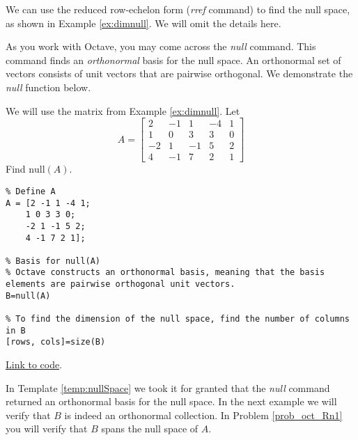 \documentclass{ximera}
\begin{document}
We can use the reduced row-echelon form (\emph{rref} command) to find the null space, as shown in Example \ref{ex:dimnull}.  We will omit the details here.

As you work with Octave, you may come across the \emph{null} command.  This command finds an \emph{orthonormal} basis for the null space.  An orthonormal set of vectors consists of unit vectors that are pairwise orthogonal.  We demonstrate the \emph{null} function below.

\begin{template}\label{temp:nullSpace}
    We will use the matrix from Example \ref{ex:dimnull}.  Let 
$$A=\begin{bmatrix}2&-1&1&-4&1\\1&0&3&3&0\\-2&1&-1&5&2\\4&-1&7&2&1\end{bmatrix}$$
Find $\mbox{null}(A)$.

\begin{verbatim}
% Define A
A = [2 -1 1 -4 1;
    1 0 3 3 0;
    -2 1 -1 5 2;
    4 -1 7 2 1];

% Basis for null(A)
% Octave constructs an orthonormal basis, meaning that the basis elements are pairwise orthogonal unit vectors.
B=null(A)

% To find the dimension of the null space, find the number of columns in B
[rows, cols]=size(B)
\end{verbatim}

\href{https://sagecell.sagemath.org/?z=eJxFj0FrwzAMhe-B_Id3KbTQjCbr2GHkkLD7LruVHlxXaQ2JVCynhf36yW3ZLDDo83t68gKfNAQmdGXRocWuQVWjRrVF_VEWsFNjg1erzbOvmvxe4w3Nk2xz-w7jeyNlsUDvNCgGieB5HJfdKsMvn9yV4IU1xdknhWNITGdhiZMbcciuNSZyHPiEdHbJLnpw0EgTcXZFwsWFeAtKD_9J2Owzh4Qr-SRRX8qib_-yc_q3wD56vA88BpukQSx-uIOshF6cp_W_iufpQDFLvIzzxIrA6MtiF-VmaxrUfavhh5b96hc072Hf&lang=octave&interacts=eJyLjgUAARUAuQ==}{Link to code}.
\end{template}

In Template \ref{temp:nullSpace} we took it for granted that the \emph{null} command returned an orthonormal basis for the null space.  In the next example we will verify that $B$ is indeed an orthonormal collection.  In Problem \ref{prob_oct_Rn1} you will verify that $B$ spans the null space of $A$.
\end{document}
